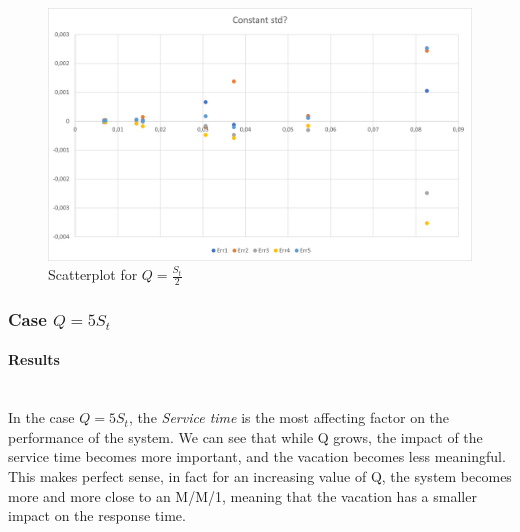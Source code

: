 \documentclass{article}
\begin{document}
                     \begin{figure}[htbp]
                        \centering
                        \includegraphics[scale=0.55]{images/standardDeviation_0,5.png}
                        \caption{Scatterplot for $Q = \frac{S_t}{2}$}
                        \label{fig:standardDeviation_0,5}
                    \end{figure}
                
        \newpage
        
        \subsubsection{Case $Q = 5S_t$}
            
                \paragraph{Results} \hfill \\
                
                In the case $Q = 5S_t$, the \textit{Service time} is the most affecting factor on the performance of the system. We can see that while Q grows, the impact of the service time becomes more important, and the vacation becomes less meaningful. This makes perfect sense, in fact for an increasing value of Q, the system becomes more and more close to an M/M/1, meaning that the vacation has a smaller impact on the response time.
\end{document}
